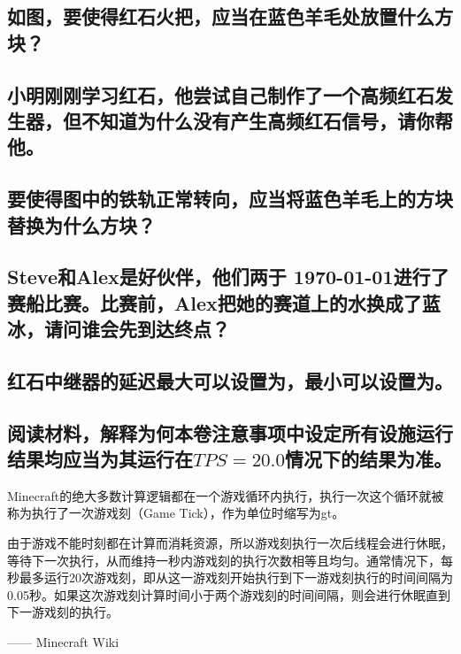 \documentclass{exampaper}
\begin{document}
            \subsection{如图，要使得红石火把，应当在\textbf{蓝色羊毛}处放置什么方块？}
            
            \subsection{小明刚刚学习红石，他尝试自己制作了一个高频红石发生器，但不知道为什么没有产生高频红石信号，请你帮他。}
            
            \subsection{要使得图中的铁轨正常转向，应当将\textbf{蓝色羊毛上的方块}替换为什么方块？}
            
            \subsection{Steve和Alex是好伙伴，他们两于 \today 进行了赛船比赛。比赛前，Alex把她的赛道上的水换成了蓝冰，请问谁会先到达终点？}
            
            \clearpage

            \subsection{红石中继器的延迟最大可以设置为\dash{1cm}，最小可以设置为\dash{1cm}。}
            
            \subsection{阅读材料，解释为何本卷\textbf{注意事项}中设定所有设施运行结果均应当为其运行在$TPS=20.0$情况下的结果为准。}
                \vspace{0.25cm}
                \begin{material}
                    Minecraft的绝大多数计算逻辑都在一个游戏循环内执行，执行一次这个循环就被称为执行了一次游戏刻（Game Tick），作为单位时缩写为gt。

                    由于游戏不能时刻都在计算而消耗资源，所以游戏刻执行一次后线程会进行休眠，等待下一次执行，从而维持一秒内游戏刻的执行次数相等且均匀。通常情况下，每秒最多运行20次游戏刻，即从这一游戏刻开始执行到下一游戏刻执行的时间间隔为0.05秒。如果这次游戏刻计算时间小于两个游戏刻的时间间隔，则会进行休眠直到下一游戏刻的执行。
                    
                    —— Minecraft Wiki
                \end{material}
                \vspace{0.25cm}
\end{document}
